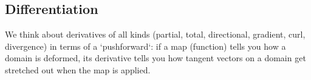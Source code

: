 \subsection{Differentiation}
We think about derivatives of all kinds (partial, total, directional, gradient, curl, divergence) in terms of a `pushforward`: if a map (function) tells you how a domain is deformed, its derivative tells you how tangent vectors on a domain get stretched out when the map is applied.

